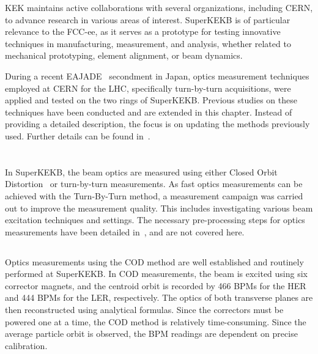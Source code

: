 KEK maintains active collaborations with several organizations, including CERN, to advance research
in various areas of interest. SuperKEKB is of particular relevance to the FCC-ee, as it serves as a
prototype for testing innovative techniques in manufacturing, measurement, and analysis, whether
related to mechanical prototyping, element alignment, or beam dynamics. 

During a recent EAJADE~\cite{noauthor_eajade_nodate} secondment in Japan, optics measurement
techniques employed at CERN for the LHC, specifically turn-by-turn acquisitions, were applied and
tested on the two rings of SuperKEKB.  Previous studies on these techniques have been conducted and
are extended in this chapter. Instead of providing a detailed description, the focus is on updating
the methods previously used. Further details can be found
in~\cite{keintzel_jacqueline_beam_2022,keintzel_superkekb_2021,keintzel_impact_2021,thrane_measuring_2020}.



\section{}

In SuperKEKB, the beam optics are measured using either Closed Orbit
Distortion~\cite{ohnishi_optics_1999} or turn-by-turn measurements. As fast optics measurements can
be achieved with the Turn-By-Turn method, a measurement campaign was carried out to improve the
measurement quality. This includes investigating various beam excitation techniques and settings.
The necessary pre-processing steps for optics measurements have been detailed
in~\cite{keintzel_jacqueline_beam_2022}, and are not covered here.


\subsection{}

Optics measurements using the COD method
\cite{harrison_global_1987,chung_measurement_1993,ohnishi_optics_1999} are well established and
routinely performed at SuperKEKB. In COD measurements, the beam is excited using six corrector
magnets, and the centroid orbit is recorded by 466 BPMs for the HER and 444 BPMs for the LER,
respectively. The optics of both transverse planes are then reconstructed using
analytical formulas. Since the correctors must be powered one at a time, the COD method is
relatively time-consuming. 
Since the average particle orbit is observed, the BPM readings are dependent on precise
calibration.


